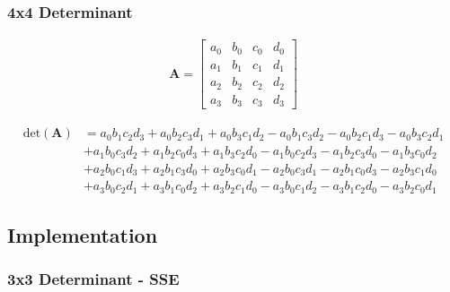 \documentclass[fontsize = 10pt,DIV = 13]{scrartcl}
\newcommand{\pth}[1]{\left(#1\right)}
\begin{document}
\subsubsection{4x4 Determinant}
\begin{align*}
\mathbf{A}
=
\begin{bmatrix}
a_0&b_0&c_0&d_0\\
a_1&b_1&c_1&d_1\\
a_2&b_2&c_2&d_2\\
a_3&b_3&c_3&d_3
\end{bmatrix}
\end{align*}


\begin{comment}

\begin{align*}
det\pth{\mathbf{A}}
&=
  a_1b_2c_3d_4 
 + a_1b_3c_4d_2 
 + a_1b_4c_2d_3 
 - a_1b_4c_3d_2
 - a_1b_2c_4d_3\\
&- a_1b_3c_2d_4
 - a_2b_1c_3d_4
 - a_4b_1c_2d_3
 - a_3b_1c_4d_2
 + a_4b_1c_3d_2\\
&+ a_2b_1c_4d_3
 + a_3b_1c_2d_4
 + a_2b_3c_1d_4
 + a_4b_2c_1d_3
 + a_3b_4c_1d_2\\
&- a_4b_3c_1d_2
 - a_2b_4c_1d_3
 - a_3b_2c_1d_4
 - a_2b_3c_4d_1
 - a_4b_2c_3d_1\\
&- a_3b_4c_2d_1
 + a_4b_3c_2d_1
 + a_2b_4c_3d_1
 + a_3b_2c_4d_1           
\end{align*}

\end{comment}


\begin{align*}
\mathrm{det}\pth{\mathbf{A}}
&
= a_0b_1c_2d_3 
+ a_0b_2c_3d_1 
+ a_0b_3c_1d_2
- a_0b_1c_3d_2
- a_0b_2c_1d_3 
- a_0b_3c_2d_1\\
&
+ a_1b_0c_3d_2
+ a_1b_2c_0d_3
+ a_1b_3c_2d_0
- a_1b_0c_2d_3
- a_1b_2c_3d_0
- a_1b_3c_0d_2\\
&
+ a_2b_0c_1d_3
+ a_2b_1c_3d_0
+ a_2b_3c_0d_1
- a_2b_0c_3d_1
- a_2b_1c_0d_3
- a_2b_3c_1d_0\\
&
+ a_3b_0c_2d_1
+ a_3b_1c_0d_2
+ a_3b_2c_1d_0
- a_3b_0c_1d_2
- a_3b_1c_2d_0
- a_3b_2c_0d_1           
\end{align*}


\subsection{Implementation}

\subsubsection{3x3 Determinant - SSE}
\label{sec:determinant3x3SSE}
\end{document}
